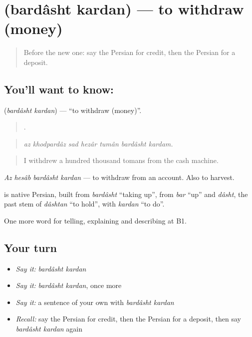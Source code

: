 \section[\texorpdfstring{\fa{برداشت} \fa{کردن} (bardâsht kardan)}{برداشت کردن (bardâsht kardan)}]{  (bardâsht kardan) — to withdraw (money)}

\label{lesson:FA-C414-bardasht-kardan}



\begin{quote}
Before the new one: say the Persian for credit, then the Persian for a deposit.
\end{quote}

\subsection*{You'll want to know:  }
\textbf{ } (\emph{bardâsht kardan}) — \textquotedblleft{}to withdraw (money)\textquotedblright{}.

\begin{quote}
      .
\end{quote}

\begin{quote}
\emph{az khodpardâz sad hezâr tumân bardâsht kardam.}
\end{quote}

\begin{quote}
I withdrew a hundred thousand tomans from the cash machine.
\end{quote}

\emph{Az hesâb bardâsht kardan} — to withdraw from an account. Also to harvest.

\begin{cousinweb}
\textbf{ } is native Persian, built from \emph{bardâsht} \textquotedblleft{}taking up\textquotedblright{}, from \emph{bar} \textquotedblleft{}up\textquotedblright{} and \emph{dâsht}, the past stem of \emph{dâshtan} \textquotedblleft{}to hold\textquotedblright{}, with \emph{kardan} \textquotedblleft{}to do\textquotedblright{}.
\end{cousinweb}

\begin{grammarlens}[title={What you've built}]
One more word for telling, explaining and describing at B1.
\end{grammarlens}

\subsection*{Your turn}
\begin{itemize}
\raggedright
  \item \emph{Say it:} \emph{bardâsht kardan}
  \item \emph{Say it:} \emph{bardâsht kardan}, once more
  \item \emph{Say it:} a sentence of your own with \emph{bardâsht kardan}
  \item \emph{Recall:} say the Persian for credit, then the Persian for a deposit, then say \emph{bardâsht kardan} again
\end{itemize}


